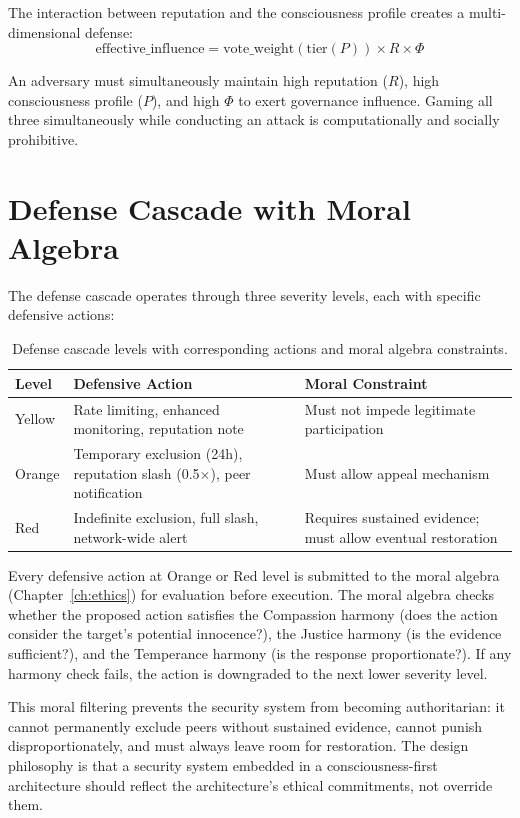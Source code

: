 \documentclass[12pt]{book}
\begin{document}
The interaction between reputation and the consciousness profile creates a multi-dimensional defense:
\begin{equation}
\text{effective\_influence} = \text{vote\_weight}(\text{tier}(P)) \times R \times \Phi
\end{equation}

An adversary must simultaneously maintain high reputation ($R$), high consciousness profile ($P$), and high $\Phi$ to exert governance influence. Gaming all three simultaneously while conducting an attack is computationally and socially prohibitive.

\section{Defense Cascade with Moral Algebra}

The defense cascade operates through three severity levels, each with specific defensive actions:

\begin{table}[H]
\centering
\caption{Defense cascade levels with corresponding actions and moral algebra constraints.}
\label{tab:defense-cascade}
\begin{tabular}{lp{4cm}p{4cm}}
\toprule
\textbf{Level} & \textbf{Defensive Action} & \textbf{Moral Constraint} \\
\midrule
Yellow & Rate limiting, enhanced monitoring, reputation note & Must not impede legitimate participation \\
Orange & Temporary exclusion (24h), reputation slash (0.5$\times$), peer notification & Must allow appeal mechanism \\
Red & Indefinite exclusion, full slash, network-wide alert & Requires sustained evidence; must allow eventual restoration \\
\bottomrule
\end{tabular}
\end{table}

Every defensive action at Orange or Red level is submitted to the moral algebra (Chapter~\ref{ch:ethics}) for evaluation before execution. The moral algebra checks whether the proposed action satisfies the Compassion harmony (does the action consider the target's potential innocence?), the Justice harmony (is the evidence sufficient?), and the Temperance harmony (is the response proportionate?). If any harmony check fails, the action is downgraded to the next lower severity level.

This moral filtering prevents the security system from becoming authoritarian: it cannot permanently exclude peers without sustained evidence, cannot punish disproportionately, and must always leave room for restoration. The design philosophy is that a security system embedded in a consciousness-first architecture should reflect the architecture's ethical commitments, not override them.
\end{document}
